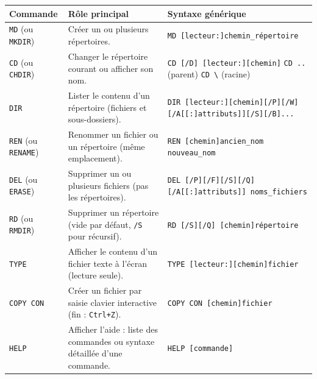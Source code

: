 \documentclass[11pt]{article}
\begin{document}
\begin{corrige}
\begin{center}
\begin{tabularx}{\linewidth}{|l|X|X|}
\hline
\rowcolor{popblueL}
\textbf{Commande} & \textbf{Rôle principal} & \textbf{Syntaxe générique} \\
\hline
\texttt{MD} (ou \texttt{MKDIR}) & Créer un ou plusieurs répertoires. & \texttt{MD [lecteur:]chemin\_répertoire} \\
\hline
\texttt{CD} (ou \texttt{CHDIR}) & Changer le répertoire courant ou afficher son nom. & \texttt{CD [/D] [lecteur:][chemin]} \newline \texttt{CD ..} (parent) \quad \texttt{CD \textbackslash} (racine) \\
\hline
\texttt{DIR} & Lister le contenu d'un répertoire (fichiers et sous-dossiers). & \texttt{DIR [lecteur:][chemin][/P][/W][/A[[:]attributs]][/S][/B]...} \\
\hline
\texttt{REN} (ou \texttt{RENAME}) & Renommer un fichier ou un répertoire (même emplacement). & \texttt{REN [chemin]ancien\_nom nouveau\_nom} \\
\hline
\texttt{DEL} (ou \texttt{ERASE}) & Supprimer un ou plusieurs fichiers (pas les répertoires). & \texttt{DEL [/P][/F][/S][/Q][/A[[:]attributs]] noms\_fichiers} \\
\hline
\texttt{RD} (ou \texttt{RMDIR}) & Supprimer un répertoire (vide par défaut, \texttt{/S} pour récursif). & \texttt{RD [/S][/Q] [chemin]répertoire} \\
\hline
\texttt{TYPE} & Afficher le contenu d'un fichier texte à l'écran (lecture seule). & \texttt{TYPE [lecteur:][chemin]fichier} \\
\hline
\texttt{COPY CON} & Créer un fichier par saisie clavier interactive (fin : \texttt{Ctrl+Z}). & \texttt{COPY CON [chemin]fichier} \\
\hline
\texttt{HELP} & Afficher l'aide : liste des commandes ou syntaxe détaillée d'une commande. & \texttt{HELP [commande]} \\
\hline
\end{tabularx}
\end{center}
\end{corrige}
\end{document}

